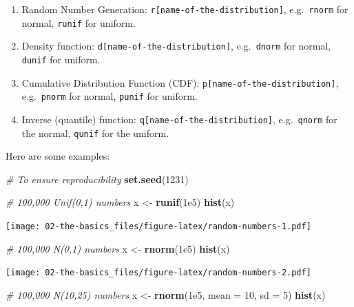 \documentclass[]{book}
\newenvironment{Shaded}{\begin{snugshade}}{\end{snugshade}}
\newcommand{\CommentTok}[1]{\textcolor[rgb]{0.56,0.35,0.01}{\textit{#1}}}
\newcommand{\DataTypeTok}[1]{\textcolor[rgb]{0.13,0.29,0.53}{#1}}
\newcommand{\DecValTok}[1]{\textcolor[rgb]{0.00,0.00,0.81}{#1}}
\newcommand{\FloatTok}[1]{\textcolor[rgb]{0.00,0.00,0.81}{#1}}
\newcommand{\KeywordTok}[1]{\textcolor[rgb]{0.13,0.29,0.53}{\textbf{#1}}}
\newcommand{\NormalTok}[1]{#1}
\newcommand{\StringTok}[1]{\textcolor[rgb]{0.31,0.60,0.02}{#1}}
\providecommand{\tightlist}{%
  \setlength{\itemsep}{0pt}\setlength{\parskip}{0pt}}
\begin{document}
\begin{enumerate}
  \begin{enumerate}
  \def\labelenumii{\alph{enumii}.}
  \tightlist
  \item
    Random Number Generation: \texttt{r{[}name-of-the-distribution{]}}, e.g.~\texttt{rnorm} for normal, \texttt{runif} for uniform.
  \item
    Density function: \texttt{d{[}name-of-the-distribution{]}}, e.g.~\texttt{dnorm} for normal, \texttt{dunif} for uniform.
  \item
    Cumulative Distribution Function (CDF): \texttt{p{[}name-of-the-distribution{]}}, e.g.~\texttt{pnorm} for normal, \texttt{punif} for uniform.
  \item
    Inverse (quantile) function: \texttt{q{[}name-of-the-distribution{]}}, e.g.~\texttt{qnorm} for the normal, \texttt{qunif} for the uniform.
  \end{enumerate}

  Here are some examples:

\begin{Shaded}
\begin{Highlighting}[]
\CommentTok{# To ensure reproducibility}
\KeywordTok{set.seed}\NormalTok{(}\DecValTok{1231}\NormalTok{)}

\CommentTok{# 100,000 Unif(0,1) numbers}
\NormalTok{x <-}\StringTok{ }\KeywordTok{runif}\NormalTok{(}\FloatTok{1e5}\NormalTok{)}
\KeywordTok{hist}\NormalTok{(x)}
\end{Highlighting}
\end{Shaded}

  \texttt{[image: 02-the-basics\_files/figure-latex/random-numbers-1.pdf]}

\begin{Shaded}
\begin{Highlighting}[]
\CommentTok{# 100,000 N(0,1) numbers}
\NormalTok{x <-}\StringTok{ }\KeywordTok{rnorm}\NormalTok{(}\FloatTok{1e5}\NormalTok{)}
\KeywordTok{hist}\NormalTok{(x)}
\end{Highlighting}
\end{Shaded}

  \texttt{[image: 02-the-basics\_files/figure-latex/random-numbers-2.pdf]}

\begin{Shaded}
\begin{Highlighting}[]
\CommentTok{# 100,000 N(10,25) numbers}
\NormalTok{x <-}\StringTok{ }\KeywordTok{rnorm}\NormalTok{(}\FloatTok{1e5}\NormalTok{, }\DataTypeTok{mean =} \DecValTok{10}\NormalTok{, }\DataTypeTok{sd =} \DecValTok{5}\NormalTok{)}
\KeywordTok{hist}\NormalTok{(x)}
\end{Highlighting}
\end{Shaded}


\end{enumerate}
\end{document}
